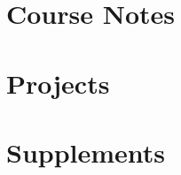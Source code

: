 \documentclass[
    draftmark = true,   %
    coverpage = cover.pdf,
    geometry = a4,    %
    fontsetup = font-setup-open.tex,
    titlesetup = titles-setup.tex
]{AJbook}
\numberwithin{equation}{section}
\begin{document}
    \frontmatter	%
    
    \mainmatter		%

    

    \part{Course Notes}

    
    

    \part{Projects}

    \part{Supplements}

    

    \backmatter
    \nocite{*}	%
    \printbibliography[heading=bibintoc]
    
    \listoffigures
    \listoftables

    {\footnotesize
    \printindex}
\end{document}
